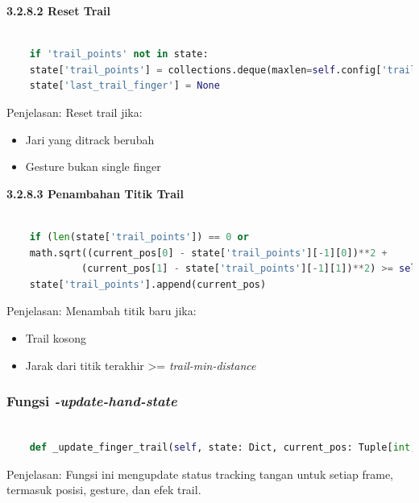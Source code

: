 \documentclass[11pt,a4paper]{article}
\begin{document}
    \noindent\textbf{3.2.8.2 Reset Trail}
    \begin{lstlisting}[language=Python, caption=Reset Trail]
        
    if 'trail_points' not in state:
    state['trail_points'] = collections.deque(maxlen=self.config['trail_max_length'])
    state['last_trail_finger'] = None
    \end{lstlisting}
    Penjelasan: 
    Reset trail jika:
    \begin{itemize}
        \item Jari yang ditrack berubah
        \item Gesture bukan single finger
    \end{itemize}

    \noindent\textbf{3.2.8.3 Penambahan Titik Trail}
    \begin{lstlisting}[language=Python, caption=Penambahan Titik Trail]
        
    if (len(state['trail_points']) == 0 or 
    math.sqrt((current_pos[0] - state['trail_points'][-1][0])**2 + 
             (current_pos[1] - state['trail_points'][-1][1])**2) >= self.config['trail_min_distance']):
    state['trail_points'].append(current_pos)
    \end{lstlisting}
    Penjelasan: 
    Menambah titik baru jika:
    \begin{itemize}
        \item Trail kosong
        \item Jarak dari titik terakhir >= \textit{trail-min-distance}
    \end{itemize}

    \subsubsection{Fungsi \textit{-update-hand-state}}
    \begin{lstlisting}[language=Python, caption=Fungsi \textit{-update-hand-state}]
    
    def _update_finger_trail(self, state: Dict, current_pos: Tuple[int, int], current_finger: str) -> None:
    \end{lstlisting}
    Penjelasan:
    Fungsi ini mengupdate status tracking tangan untuk setiap frame, termasuk posisi, gesture, dan efek trail.
\end{document}
